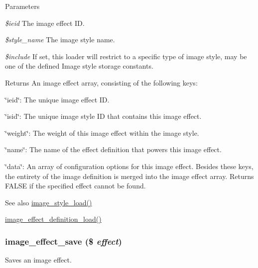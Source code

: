 \begin{DoxyParams}{Parameters}
\item[{\em \$ieid}]The image effect ID. \item[{\em \$style\_\-name}]The image style name. \item[{\em \$include}]If set, this loader will restrict to a specific type of image style, may be one of the defined Image style storage constants.\end{DoxyParams}
\begin{DoxyReturn}{Returns}
An image effect array, consisting of the following keys:
\begin{DoxyItemize}
\item \char`\"{}ieid\char`\"{}: The unique image effect ID.
\item \char`\"{}isid\char`\"{}: The unique image style ID that contains this image effect.
\item \char`\"{}weight\char`\"{}: The weight of this image effect within the image style.
\item \char`\"{}name\char`\"{}: The name of the effect definition that powers this image effect.
\item \char`\"{}data\char`\"{}: An array of configuration options for this image effect. Besides these keys, the entirety of the image definition is merged into the image effect array. Returns FALSE if the specified effect cannot be found. 
\end{DoxyItemize}
\end{DoxyReturn}
\begin{DoxySeeAlso}{See also}
\hyperlink{image_8module_a0d7388bec5f42788968823a8099a64a7}{image\_\-style\_\-load()} 

\hyperlink{image_8module_a91383fe83b2a2da4c90b4221e48abf6a}{image\_\-effect\_\-definition\_\-load()} 
\end{DoxySeeAlso}
\hypertarget{image_8module_aafc029da510317ef4aaf45be74864f17}{
\subsubsection[{image\_\-effect\_\-save}]{\setlength{\rightskip}{0pt plus 5cm}image\_\-effect\_\-save (\$ {\em effect})}}
\label{image_8module_aafc029da510317ef4aaf45be74864f17}
Saves an image effect.


